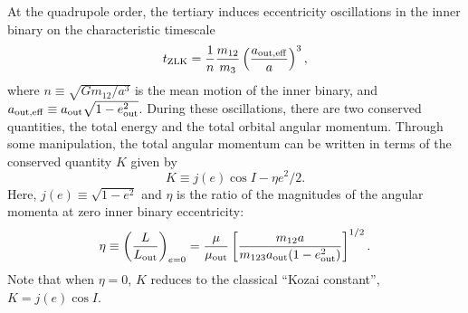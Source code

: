 \documentclass[
        fleqn,
        usenatbib,
    ]{mnras}
\newcommand*{\p}[1]{\left(#1\right)}
\newcommand*{\s}[1]{\left[#1\right]}
\begin{document}
At the quadrupole order, the tertiary induces eccentricity oscillations in the
inner binary on the characteristic timescale
\begin{equation}
    t_{\rm ZLK} = \frac{1}{n}\frac{m_{12}}{m_3}
            \p{\frac{a_{\rm out, eff}}{a}}^3,\label{eq:def_tzlk}
\end{equation}
where $n \equiv \sqrt{Gm_{12} / a^3}$ is the mean motion of the inner binary,
and $a_{\rm out, eff} \equiv a_{\rm out}\sqrt{1 - e_{\rm out}^2}$. During these
oscillations, there are two conserved quantities, the total energy and the total
orbital angular momentum. Through some manipulation, the total angular momentum
can be written in terms of the conserved quantity $K$ given by
\begin{equation}
    K \equiv j(e) \cos I - \eta e^2 / 2. \label{eq:def_K}
\end{equation}
Here, $j(e) \equiv \sqrt{1 - e^2}$ and $\eta$ is the ratio of the magnitudes of
the angular momenta at zero inner binary eccentricity:
\begin{equation}
    \eta \equiv \p{\frac{L}{L_{\rm out}}}_{e = 0}
        = \frac{\mu}{\mu_{\rm out}}\s{\frac{m_{12}a}
            {m_{123}a_{\rm out}(1 - e_{\rm out}^2)}}^{1/2}.\label{eq:def_eta}
\end{equation}
Note that when $\eta = 0$, $K$ reduces to the classical ``Kozai constant'', $K =
j(e) \cos I$.
\end{document}
